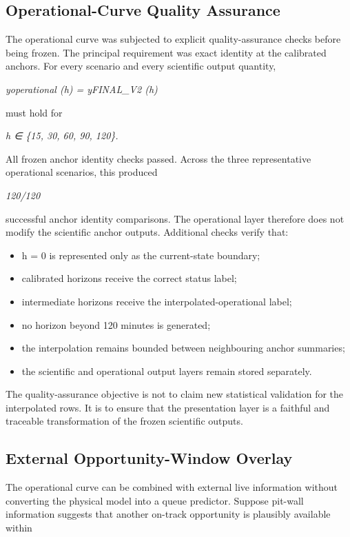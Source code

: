 \subsection{Operational-Curve Quality Assurance}
The operational curve was subjected to explicit quality-assurance checks before being frozen. The principal requirement was exact identity at the calibrated anchors. For every scenario and every scientific output quantity,

\begin{center}\textit{yoperational (h) = yFINAL\_V2 (h)}\end{center}

must hold for

\begin{center}\textit{h ∈ \{15, 30, 60, 90, 120\}.}\end{center}

All frozen anchor identity checks passed. Across the three representative operational scenarios, this produced

\begin{center}\textit{120/120}\end{center}

successful anchor identity comparisons. The operational layer therefore does not modify the scientific anchor outputs. Additional checks verify that:

\begin{itemize}
\item h = 0 is represented only as the current-state boundary;
\item calibrated horizons receive the correct status label;
\item intermediate horizons receive the interpolated-operational label;
\item no horizon beyond 120 minutes is generated;
\item the interpolation remains bounded between neighbouring anchor summaries;
\item the scientific and operational output layers remain stored separately.
\end{itemize}

The quality-assurance objective is not to claim new statistical validation for the interpolated rows. It is to ensure that the presentation layer is a faithful and traceable transformation of the frozen scientific outputs.

\subsection{External Opportunity-Window Overlay}
The operational curve can be combined with external live information without converting the physical model into a queue predictor. Suppose pit-wall information suggests that another on-track opportunity is plausibly available within

